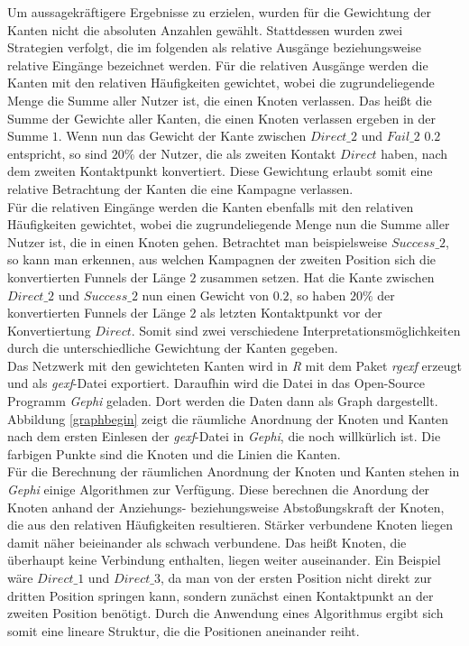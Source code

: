 Um aussagekräftigere Ergebnisse zu erzielen, wurden für die Gewichtung der Kanten nicht die absoluten Anzahlen gewählt. Stattdessen wurden zwei Strategien verfolgt, die im folgenden als relative Ausgänge beziehungsweise relative Eingänge bezeichnet werden. Für die relativen Ausgänge werden die Kanten mit den relativen Häufigkeiten gewichtet, wobei die zugrundeliegende Menge die Summe aller Nutzer ist, die einen Knoten verlassen. Das heißt die Summe der Gewichte aller Kanten, die einen Knoten verlassen ergeben in der Summe $1$. Wenn nun das Gewicht der Kante zwischen $Direct\_2$ und $Fail\_2$ $0.2$ entspricht, so sind $20 \%$ der Nutzer, die als zweiten Kontakt $Direct$ haben, nach dem zweiten Kontaktpunkt konvertiert. Diese Gewichtung erlaubt somit eine relative Betrachtung der Kanten die eine Kampagne verlassen.\\
Für die relativen Eingänge werden die Kanten ebenfalls mit den relativen Häufigkeiten gewichtet, wobei die zugrundeliegende Menge nun die Summe aller Nutzer ist, die in einen Knoten gehen. Betrachtet man beispielsweise $Success\_2$, so kann man erkennen, aus welchen Kampagnen der zweiten Position sich die konvertierten Funnels der Länge $2$ zusammen setzen. Hat die Kante zwischen $Direct\_2$ und $Success\_2$ nun einen Gewicht von $0.2$, so haben $20 \%$ der konvertierten Funnels der Länge $2$ als letzten Kontaktpunkt vor der Konvertiertung $Direct$. Somit sind zwei verschiedene Interpretationsmöglichkeiten durch die unterschiedliche Gewichtung der Kanten gegeben.\\
Das Netzwerk mit den gewichteten Kanten wird in \textit{R} mit dem Paket \textit{rgexf} \cite{rgexf} erzeugt und als \textit{gexf}-Datei exportiert. Daraufhin wird die Datei in das Open-Source Programm \textit{Gephi} \cite{gephi_bastian} geladen. Dort werden die Daten dann als Graph dargestellt. Abbildung \ref{graphbegin} zeigt die räumliche Anordnung der Knoten und Kanten nach dem ersten Einlesen der \textit{gexf}-Datei in \textit{Gephi}, die noch willkürlich ist. Die farbigen Punkte sind die Knoten und die Linien die Kanten.\\
Für die Berechnung der räumlichen Anordnung der Knoten und Kanten stehen in \textit{Gephi} einige Algorithmen zur Verfügung. Diese berechnen die Anordung der Knoten anhand der Anziehungs- beziehungsweise Abstoßungskraft der Knoten, die aus den relativen Häufigkeiten resultieren. Stärker verbundene Knoten liegen damit näher beieinander als schwach verbundene. Das heißt Knoten, die überhaupt keine Verbindung enthalten, liegen weiter auseinander. Ein Beispiel wäre $Direct\_1$ und $Direct\_3$, da man von der ersten Position nicht direkt zur dritten Position springen kann, sondern zunächst einen Kontaktpunkt an der zweiten Position benötigt. Durch die Anwendung eines Algorithmus ergibt sich somit eine lineare Struktur, die die Positionen aneinander reiht.\\
